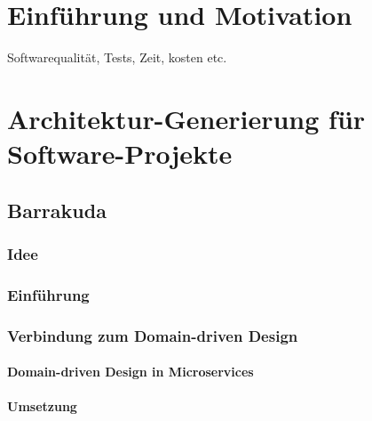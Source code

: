 \documentclass[12pt,a4paper,bibliography=totocnumbered,listof=totocnumbered]{scrartcl}
\begin{document}
\onehalfspacing
\renewcommand{\thesection}{\arabic{section}}
\renewcommand{\theHsection}{\arabic{section}}
\setcounter{section}{0}
\setcounter{page}{1}

\section{Einführung und Motivation}

Softwarequalität, Tests, Zeit, kosten etc.

\section{Architektur-Generierung für Software-Projekte}

\subsection{Barrakuda}

\subsubsection{Idee}

\subsubsection{Einführung}

\subsubsection{Verbindung zum Domain-driven Design}

\paragraph{Domain-driven Design in Microservices}

\paragraph{Umsetzung}
\end{document}
